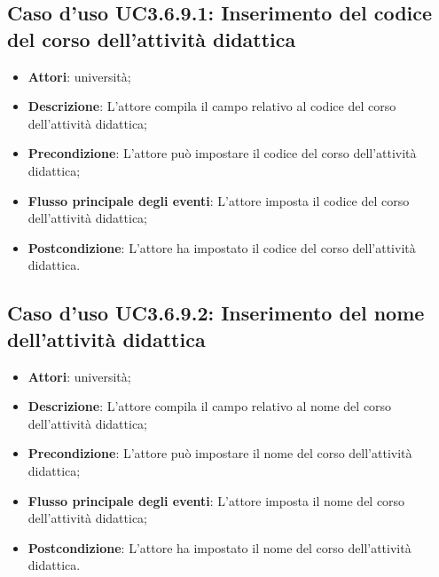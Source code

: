\subsection{Caso d'uso \texorpdfstring{UC3.6.9.1}{UC3.6.9.1}: Inserimento del codice del corso dell’attività didattica}
\begin{itemize}
\item \textbf{Attori}: università;
\item \textbf{Descrizione}: L'attore compila il campo relativo al codice del corso dell'attività didattica;

\item \textbf{Precondizione}: L'attore può impostare il codice del corso dell'attività didattica;

\item \textbf{Flusso principale degli eventi}: L'attore imposta il codice del corso dell'attività didattica;

\item \textbf{Postcondizione}: L'attore ha impostato il codice del corso dell'attività didattica.

\end{itemize}
\subsection{Caso d'uso \texorpdfstring{UC3.6.9.2}{UC3.6.9.2}: Inserimento del nome dell’attività didattica}
\begin{itemize}
\item \textbf{Attori}: università;
\item \textbf{Descrizione}: L'attore compila il campo relativo al nome del corso dell'attività didattica;

\item \textbf{Precondizione}: L'attore può impostare il nome del corso dell'attività didattica;

\item \textbf{Flusso principale degli eventi}: L'attore imposta il nome del corso dell'attività didattica;

\item \textbf{Postcondizione}: L'attore ha impostato il nome del corso dell'attività didattica.

\end{itemize}
